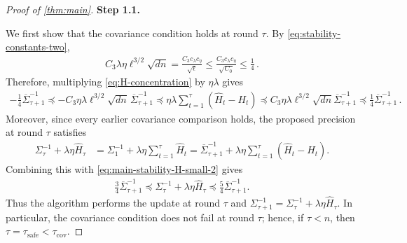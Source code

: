 \documentclass[11pt]{article}
\newcommand{\proofstepinline}[1]{%
    {\sffamily\bfseries\color{blue!55!black}Step #1.}\enspace
}
\newcommand{\1}{\mathbf 1}
\begin{document}
\begin{proof}[Proof of \cref{thm:main}]
    \proofstepinline{1.1}
    We first show that the covariance condition holds at round $\tau$.
    By \eqref{eq:stability-constants-two},
    \begin{align}
        C_3\lambda\eta\ell^{3/2}\sqrt{dn}
        =
        \frac{C_3c_\lambda c_\eta}{\sqrt\ell}
        \leq
        \frac{C_3c_\lambda c_\eta}{\sqrt{C_0}}
        \leq\frac14\,.
        \label{eq:main-stability-H-small}
    \end{align}
    Therefore, multiplying \eqref{eq:H-concentration} by $\eta\lambda$ gives
    \begin{align}
        -\frac14
        \overline\Sigma_{\tau+1}^{-1}
        \preceq
        -C_3\eta\lambda\ell^{3/2}\sqrt{dn}\,
        \overline\Sigma_{\tau+1}^{-1}
        \preceq
        \eta\lambda
        \sum_{t=1}^{\tau}
        (\widehat H_t-H_t)
        \preceq
        C_3\eta\lambda\ell^{3/2}\sqrt{dn}
        \overline\Sigma_{\tau+1}^{-1}
        \preceq
        \frac{1}{4}
        \overline\Sigma_{\tau+1}^{-1}\,.
        \label{eq:main-stability-H-small-2}
    \end{align}
    Moreover, since every earlier covariance comparison holds, the proposed
    precision at round $\tau$ satisfies
    \begin{align}
        \Sigma_{\tau}^{-1}
        +\lambda\eta\widehat H_{\tau}
         & =
        \Sigma_1^{-1}
        +\lambda\eta\sum_{t=1}^{\tau}\widehat H_t
        =
        \overline\Sigma_{\tau+1}^{-1}
        +
        \lambda\eta\sum_{t=1}^{\tau}
        (\widehat H_t-H_t).
    \end{align}
    Combining this with \eqref{eq:main-stability-H-small-2} gives
    \begin{align}
        \frac34\overline\Sigma_{\tau+1}^{-1}
        \preceq
        \Sigma_{\tau}^{-1}
        +\lambda\eta\widehat H_{\tau}
        \preceq\frac54\overline\Sigma_{\tau+1}^{-1}.
        \label{eq:main-strict-comparison}
    \end{align}
    Thus the algorithm performs the update at round $\tau$ and
    $\Sigma_{\tau+1}^{-1}
        =\Sigma_{\tau}^{-1}
        +\lambda\eta\widehat H_{\tau}$.
    In particular, the covariance condition does not fail at round $\tau$;
    hence, if $\tau<n$, then
    $\tau=\tau_{\mathrm{safe}}<\tau_{\mathrm{cov}}$.


\end{proof}
\end{document}
